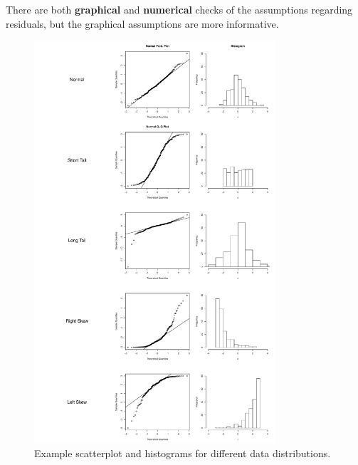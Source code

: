 \documentclass[12pt]{../notes}
\begin{document}
\nspace
There are both \textbf{graphical} and \textbf{numerical} checks of the assumptions regarding residuals, but the graphical assumptions are more informative. 

\begin{figure}[H]
\includegraphics[width = 0.8\textwidth]{../figures/module2/distTable.pdf}
\caption{Example scatterplot and histograms for different data distributions.}
\end{figure}
\end{document}

